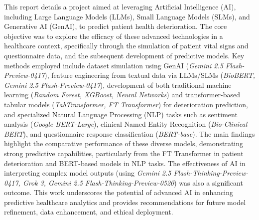 This report details a project aimed at leveraging Artificial Intelligence (AI), including Large Language Models (LLMs), Small Language Models (SLMs), and Generative AI (GenAI), to predict patient health deterioration. The core objective was to explore the efficacy of these advanced technologies in a healthcare context, specifically through the simulation of patient vital signs and questionnaire data, and the subsequent development of predictive models. Key methods employed include dataset simulation using GenAI (\textit{Gemini 2.5 Flash-Preview-0417}), feature engineering from textual data via LLMs/SLMs (\textit{BioBERT, Gemini 2.5 Flash-Preview-0417}), development of both traditional machine learning (\textit{Random Forest, XGBoost, Neural Networks}) and transformer-based tabular models (\textit{TabTransformer, FT Transformer}) for deterioration prediction, and specialized Natural Language Processing (NLP) tasks such as sentiment analysis (\textit{Google BERT-Large}), clinical Named Entity Recognition (\textit{Bio-Clinical BERT}), and questionnaire response classification (\textit{BERT-base}). The main findings highlight the comparative performance of these diverse models, demonstrating strong predictive capabilities, particularly from the FT Transformer in patient deterioration and BERT-based models in NLP tasks. The effectiveness of AI in interpreting complex model outputs (using \textit{Gemini 2.5 Flash-Thinking-Preview-0417, Grok 3, Gemini 2.5 Flash-Thinking-Preview-0520}) was also a significant outcome. This work underscores the potential of advanced AI in enhancing predictive healthcare analytics and provides recommendations for future model refinement, data enhancement, and ethical deployment.
